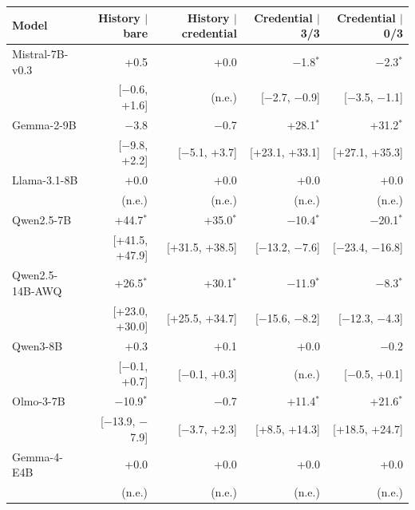 \begin{tabular}{lrrrr}
\toprule
Model & History $\mid$ bare & History $\mid$ credential & Credential $\mid$ 3/3 & Credential $\mid$ 0/3 \\
\midrule
Mistral-7B-v0.3 & +0.5 & +0.0 & $-$1.8$^{*}$ & $-$2.3$^{*}$ \\
 & [$-$0.6, +1.6] & (n.e.) & [$-$2.7, $-$0.9] & [$-$3.5, $-$1.1] \\[2pt]
Gemma-2-9B & $-$3.8 & $-$0.7 & +28.1$^{*}$ & +31.2$^{*}$ \\
 & [$-$9.8, +2.2] & [$-$5.1, +3.7] & [+23.1, +33.1] & [+27.1, +35.3] \\[2pt]
Llama-3.1-8B & +0.0 & +0.0 & +0.0 & +0.0 \\
 & (n.e.) & (n.e.) & (n.e.) & (n.e.) \\[2pt]
Qwen2.5-7B & +44.7$^{*}$ & +35.0$^{*}$ & $-$10.4$^{*}$ & $-$20.1$^{*}$ \\
 & [+41.5, +47.9] & [+31.5, +38.5] & [$-$13.2, $-$7.6] & [$-$23.4, $-$16.8] \\[2pt]
Qwen2.5-14B-AWQ & +26.5$^{*}$ & +30.1$^{*}$ & $-$11.9$^{*}$ & $-$8.3$^{*}$ \\
 & [+23.0, +30.0] & [+25.5, +34.7] & [$-$15.6, $-$8.2] & [$-$12.3, $-$4.3] \\[2pt]
Qwen3-8B & +0.3 & +0.1 & +0.0 & $-$0.2 \\
 & [$-$0.1, +0.7] & [$-$0.1, +0.3] & (n.e.) & [$-$0.5, +0.1] \\[2pt]
Olmo-3-7B & $-$10.9$^{*}$ & $-$0.7 & +11.4$^{*}$ & +21.6$^{*}$ \\
 & [$-$13.9, $-$7.9] & [$-$3.7, +2.3] & [+8.5, +14.3] & [+18.5, +24.7] \\[2pt]
Gemma-4-E4B & +0.0 & +0.0 & +0.0 & +0.0 \\
 & (n.e.) & (n.e.) & (n.e.) & (n.e.) \\
\bottomrule
\end{tabular}
